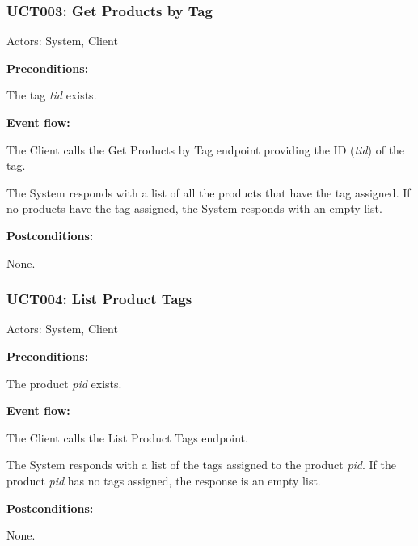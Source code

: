 \begin{ucbox}{\subsubsection{UCT003: Get Products by Tag}}
\label{UCT003}

Actors: System, Client

\textbf{Preconditions:}

\ucitem The tag \textit{tid} exists.

\textbf{Event flow:}

\ucitem The Client calls the Get Products by Tag endpoint providing the ID (\textit{tid}) of the tag.

\ucitem The System responds with a list of all the products that have the tag assigned. If no products have the tag assigned, the System responds with an empty list.

\textbf{Postconditions:}

\ucitem None.

\end{ucbox}

\begin{ucbox}{\subsubsection{UCT004: List Product Tags}}
\label{UCT004}

Actors: System, Client

\textbf{Preconditions:}

\ucitem The product \textit{pid} exists.

\textbf{Event flow:}

\ucitem The Client calls the List Product Tags endpoint.

\ucitem The System responds with a list of the tags assigned to the product \textit{pid}. If the product \textit{pid} has no tags assigned, the response is an empty list.

\textbf{Postconditions:}

\ucitem None.

\end{ucbox}
\newpage
